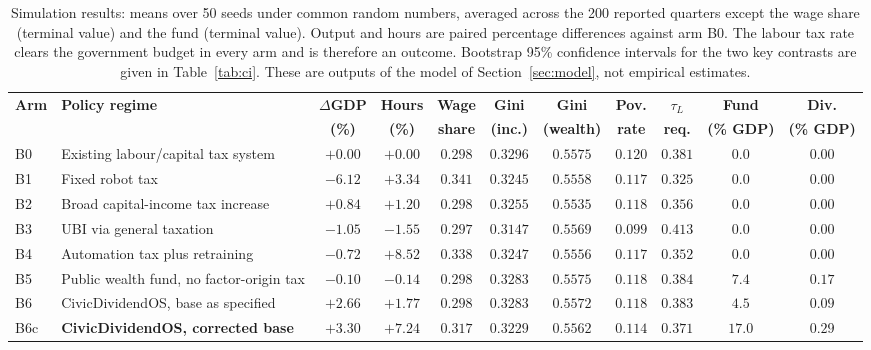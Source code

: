 \begin{table}[!t]
\centering
\caption{Simulation results: means over 50 seeds under common random numbers, averaged across the 200 reported quarters except the wage share (terminal value) and the fund (terminal value). Output and hours are paired percentage differences against arm B0. The labour tax rate clears the government budget in every arm and is therefore an outcome. Bootstrap 95\% confidence intervals for the two key contrasts are given in Table~\ref{tab:ci}. These are outputs of the model of Section~\ref{sec:model}, not empirical estimates.}
\label{tab:results}
\footnotesize
\begin{tabular}{@{}l l c c c c c c c c c@{}}
\toprule
\textbf{Arm} & \textbf{Policy regime} & $\Delta$\textbf{GDP} & \textbf{Hours} & \textbf{Wage} & \textbf{Gini} & \textbf{Gini} & \textbf{Pov.} & $\tau_L$ & \textbf{Fund} & \textbf{Div.} \\
 & & \textbf{(\%)} & \textbf{(\%)} & \textbf{share} & \textbf{(inc.)} & \textbf{(wealth)} & \textbf{rate} & \textbf{req.} & \textbf{(\% GDP)} & \textbf{(\% GDP)} \\
\midrule
B0 & Existing labour/capital tax system & $+0.00$ & $+0.00$ & $0.298$ & $0.3296$ & $0.5575$ & $0.120$ & $0.381$ & $0.0$ & $0.00$ \\
B1 & Fixed robot tax & $-6.12$ & $+3.34$ & $0.341$ & $0.3245$ & $0.5558$ & $0.117$ & $0.325$ & $0.0$ & $0.00$ \\
B2 & Broad capital-income tax increase & $+0.84$ & $+1.20$ & $0.298$ & $0.3255$ & $0.5535$ & $0.118$ & $0.356$ & $0.0$ & $0.00$ \\
B3 & UBI via general taxation & $-1.05$ & $-1.55$ & $0.297$ & $0.3147$ & $0.5569$ & $0.099$ & $0.413$ & $0.0$ & $0.00$ \\
B4 & Automation tax plus retraining & $-0.72$ & $+8.52$ & $0.338$ & $0.3247$ & $0.5556$ & $0.117$ & $0.352$ & $0.0$ & $0.00$ \\
B5 & Public wealth fund, no factor-origin tax & $-0.10$ & $-0.14$ & $0.298$ & $0.3283$ & $0.5575$ & $0.118$ & $0.384$ & $7.4$ & $0.17$ \\
B6 & CivicDividendOS, base as specified & $+2.66$ & $+1.77$ & $0.298$ & $0.3283$ & $0.5572$ & $0.118$ & $0.383$ & $4.5$ & $0.09$ \\
B6c & \textbf{CivicDividendOS, corrected base} & $+3.30$ & $+7.24$ & $0.317$ & $0.3229$ & $0.5562$ & $0.114$ & $0.371$ & $17.0$ & $0.29$ \\
\bottomrule
\end{tabular}
\end{table}
